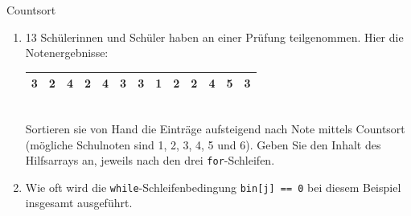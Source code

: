 \documentclass[11pt,a4paper]{article}
\begin{document}
\thispagestyle{empty}




\begin{aufgabe}{1}{Countsort}
    \begin{enumerate}
        \item
        13 Schülerinnen und Schüler haben an einer Prüfung teilgenommen.
        Hier die Notenergebnisse:
        \begin{table}[h!]
            \centering
            \begin{tabular}{|c|c|c|c|c|c|c|c|c|c|c|c|c|}
                \hline
                3 & 2 & 4 & 2 & 4 & 3 & 3 & 1 & 2 & 2 & 4 & 5 & 3 \\
                \hline
            \end{tabular}
        \end{table}
        \ \\
        Sortieren sie von Hand die Einträge aufsteigend nach Note mittels Countsort (mögliche Schulnoten sind 1, 2, 3, 4, 5 und 6).
        Geben Sie den Inhalt des Hilfsarrays an, jeweils nach den drei \texttt{for}-Schleifen.

        \item
        Wie oft wird die \texttt{while}-Schleifenbedingung \texttt{bin[j] == 0} bei diesem Beispiel insgesamt ausgeführt.
    \end{enumerate}
\end{aufgabe}
\end{document}
